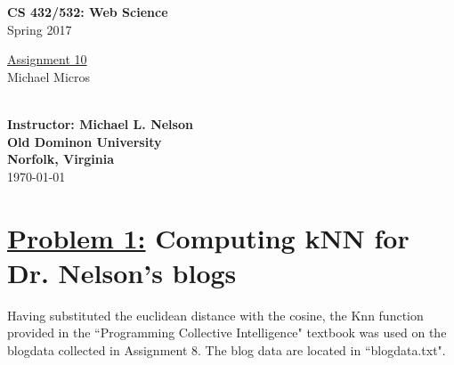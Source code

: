 \documentclass{article}
\begin{document}

\begin{titlepage}

\vspace*{45 pt}
\begin{center}
\Huge{\bf CS 432/532:  Web Science}\\
\huge{Spring 2017\\}

\vspace{60 pt}
\Huge\underline {Assignment 10}\\

\vspace{10 pt}
\Huge{Michael Micros}\\\

{\Large \bf {Instructor: Michael L. Nelson}}\\

\vspace{230 pt}
{\huge \bf {Old Dominon University}}\\
{\huge \bf {Norfolk, Virginia}}\\

\vspace{10 pt}
\today

\end{center}
\end{titlepage}





\section*{{\underline{\huge {Problem 1:}} Computing kNN for Dr. Nelson's blogs}}
 Having substituted the euclidean distance with the cosine, the Knn function provided in the ``Programming Collective Intelligence" textbook was used on the blogdata collected in Assignment 8. The blog data are located in ``blogdata.txt". 
\end{document}
